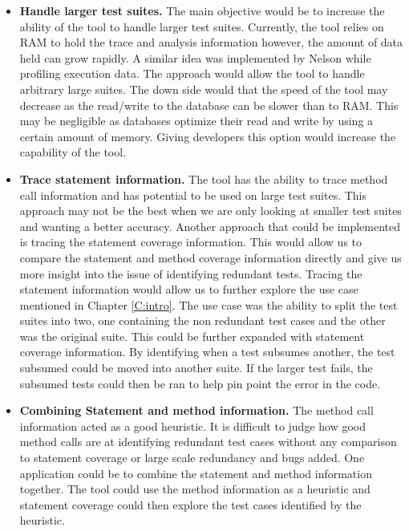 \begin{itemize}

\item \textbf{Handle larger test suites.} The main objective would be to increase the ability of the tool to handle larger test suites. Currently, the tool relies on RAM to hold the trace and analysis information however, the amount of data held can grow rapidly. A similar idea was implemented by Nelson \cite{nelson2012profiling} while profiling execution data. The approach would allow the tool to handle arbitrary large suites. The down side would that the speed of the tool may decrease as the read/write to the database can be slower than to RAM. This may be negligible as databases optimize their read and write by using a certain amount of memory. Giving developers this option would increase the capability of the tool. 

\item \textbf{Trace statement information.} The tool has the ability to trace method call information and has potential to be used on large test suites. This approach may not be the best when we are only looking at smaller test suites and wanting a better accuracy. Another approach that could be implemented is tracing the statement coverage information. This would allow us to compare the statement and method coverage information directly and give us more insight into the issue of identifying redundant tests. Tracing the statement information would allow us to further explore the use case mentioned in Chapter \ref{C:intro}. The use case was the ability to split the test suites into two, one containing the non redundant test cases and the other was the original suite. This could be further expanded with statement coverage information. By identifying when a test subsumes another, the test subsumed could be moved into another suite. If the larger test fails, the subsumed tests could then be ran to help pin point the error in the code.

\item \textbf{Combining Statement and method information.} The method call information acted as a good heuristic. It is difficult to judge how good method calls are at identifying redundant test cases without any comparison to statement coverage or large scale redundancy and bugs added. One application could be to combine the statement and method information together. The tool could use the method information as a heuristic and statement coverage could then explore the test cases identified by the heuristic.

\end{itemize}

